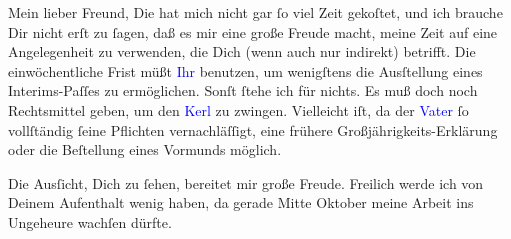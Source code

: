 \pstart\center{}Mein lieber Freund,\pend
\pstart
           Die \label{K_L03223-1v}\label{K_L03223-1h} hat
               mich nicht gar ſo viel Zeit gekoſtet, und ich brauche Dir nicht erſt zu ſagen, daß es
               mir eine große Freude macht, meine Zeit auf eine Angelegenheit zu verwenden, die Dich
               (wenn auch nur indirekt) betrifft. Die einwöchentliche Frist müßt \textcolor{blue}{Ihr}{}\ledrightnote{{$\rightarrow$}\textcolor{blue}{Elisabeth Steinrück}{\newline}{$\rightarrow$}\textcolor{blue}{Olga Schnitzler}} benutzen, um wenigſtens die
               Ausſtellung eines Interims-Paſſes zu ermöglichen. Sonſt ſtehe ich {\pb}für nichts. Es muß doch noch Rechtsmittel geben, um
               den \textcolor{blue}{Kerl}{}\ledrightnote{{$\rightarrow$}\textcolor{blue}{Rudolf Gussmann}} zu zwingen.
               Vielleicht iſt, da der \textcolor{blue}{Vater}{}\ledrightnote{{$\rightarrow$}\textcolor{blue}{Rudolf Gussmann}}
               ſo vollſtändig ſeine Pflichten vernachläſſigt, eine frühere Großjährigkeits-Erklärung
               oder die Beſtellung eines Vormunds möglich.\pend
           
\pstart
           Die Ausſicht, Dich \label{K_L03223-2v}\label{K_L03223-2h} zu ſehen, bereitet mir große Freude. Freilich werde ich von Deinem
               Aufenthalt wenig haben, {\pb}da gerade Mitte Oktober meine Arbeit ins Ungeheure wachſen
               dürfte.\pend
           
